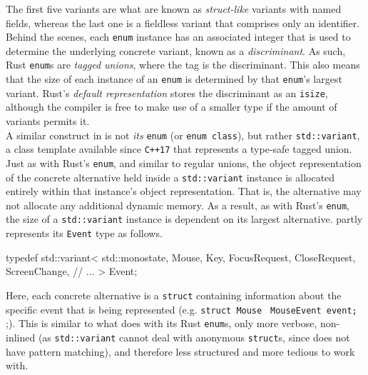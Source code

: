 The   first  five   variants  are   what  are   known  as   \textit{struct-like}
variants   with  named   fields,   whereas   the  last   one   is  a   fieldless
variant  that   comprises  only  an   identifier\cite{therustreference}.  Behind
the   scenes,   each   \texttt{enum}  instance   has   an   associated
integer   that  is   used  to   determine  the   underlying  concrete   variant,
known   as  a   \textit{discriminant}\cite{therustreference}.   As  such,   Rust
\texttt{enum}s  are  \textit{tagged  unions},  where the  tag  is  the
discriminant.  This   also  means  that  the   size  of  each  instance   of  an
\texttt{enum} is determined  by that \texttt{enum}'s largest
variant. Rust's  \textit{default representation}  stores the discriminant  as an
\texttt{isize}, although the compiler is free to make use of a smaller
type if the amount of variants permits it\cite{therustreference}.\\


A  similar construct  in  \cpp is  not  \textit{its} \texttt{enum}  (or
\texttt{enum  class}),  but  rather  \texttt{std::variant},  a
class template available since \texttt{C++17} that represents a type-safe tagged
union\cite{cppstd}. Just as with  Rust's \texttt{enum}, and similar to
regular  unions, the  object  representation of  the  concrete alternative  held
inside a  \texttt{std::variant} instance  is allocated  entirely within
that instance's object representation\cite{cppstd}. That is, the alternative may
not allocate  any additional dynamic  memory\cite{cppstd}. As a result,  as with
Rust's  \texttt{enum}, the  size  of a  \texttt{std::variant}
instance  is dependent  on its  largest alternative\cite{cppstd}.  \wmcpp partly
represents its \texttt{Event} type as follows.

\begin{cppblock}
  typedef std::variant<
    std::monostate,
    Mouse,
    Key,
    FocusRequest,
    CloseRequest,
    ScreenChange,
    // ...
  > Event;
\end{cppblock}

Here, each  concrete alternative  is a \cpp  \texttt{struct} containing
information  about   the  specific  event   that  is  being   represented  (e.g.
\texttt{struct Mouse}  \texttt{{ MouseEvent event;  }};). This
is  similar to  what \wmrs  does  with its  Rust \texttt{enum}s,  only
more verbose,  non-inlined (as  \texttt{std::variant} cannot  deal with
anonymous \texttt{struct}s, since \cpp does not have pattern matching),
and therefore less structured and more tedious to work with.\\

